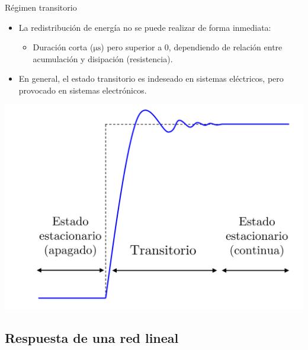 \documentclass[aspectratio=169, usenames,svgnames,dvipsnames]{beamer}
\begin{document}
\begin{frame}[label={sec:orga3570de}]{Régimen transitorio}
\begin{itemize}
\item La redistribución de energía \alert{no} se puede realizar de forma \alert{inmediata}:
\begin{itemize}
\item \alert{Duración corta} (\(\si{\micro\second}\)) pero superior a 0, dependiendo de \alert{relación entre acumulación y disipación} (resistencia).
\end{itemize}
\item En general, el estado transitorio es indeseado en sistemas eléctricos, pero provocado en sistemas electrónicos.
\end{itemize}

\begin{center}
\includegraphics[height=0.55\textheight]{../figs/ej_transitorio_DC.png}
\end{center}
\end{frame}
\subsection{Respuesta de una red lineal}
\label{sec:org5a89937}
\end{document}
